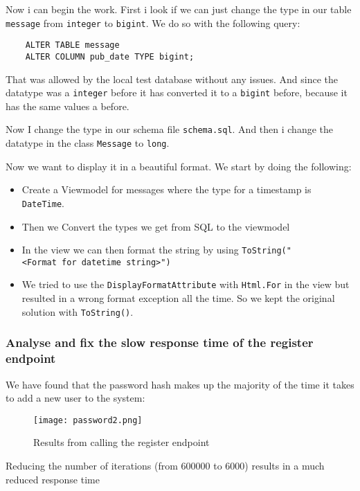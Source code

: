 Now i can begin the work. First i look if we can just change the type in our table \texttt{message} from \texttt{integer} to \texttt{bigint}. We do so with the following query:

\begin{verbatim}
    ALTER TABLE message
	ALTER COLUMN pub_date TYPE bigint;
\end{verbatim}

That was allowed by the local test database without any issues. And since the datatype was a \texttt{integer} before it has converted it to a \texttt{bigint} before, because it has the same values a before.

Now I change the type in our schema file \texttt{schema.sql}. And then i change the datatype in the class \texttt{Message} to
\texttt{long}.

Now we want to display it in a beautiful format. We start by doing the following:

\begin{itemize}
    \item Create a Viewmodel for messages where the type for a timestamp is \texttt{DateTime}.
    \item Then we Convert the types we get from SQL to the viewmodel
    \item In the view we can then format the string by using \texttt{ToString("\textless{}Format\ for\ datetime\ string\textgreater{}")}
    \item We tried to use the \texttt{DisplayFormatAttribute} with \texttt{Html.For} in the view but resulted in a wrong format exception all the time. So we kept the original solution with \texttt{ToString()}.
\end{itemize}

\subsubsection{Analyse and fix the slow response time of the register endpoint}
\label{log:analyse-and-fix-the-slow-response-time-of-the-register-endpoint}

We have found that the password hash makes up the majority of the time it takes to add a new user to the system:

\begin{figure}[H]
\centering
\texttt{[image: password2.png]}
\caption{Results from calling the register endpoint}
\end{figure}

Reducing the number of iterations (from 600000 to 6000) results in a much reduced response time

